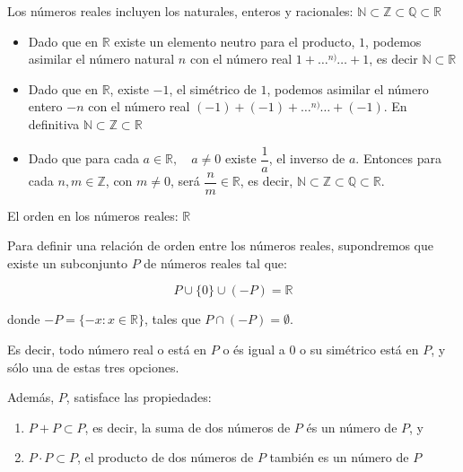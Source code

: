 \documentclass[
  ignorenonframetext,
]{beamer}
\begin{document}
\begin{frame}{Los números reales incluyen los naturales, enteros y
racionales:
\(\mathbb{N} \subset \mathbb{Z} \subset \mathbb{Q} \subset \mathbb{R}\)}
\protect\hypertarget{los-nuxfameros-reales-incluyen-los-naturales-enteros-y-racionales-mathbbn-subset-mathbbz-subset-mathbbq-subset-mathbbr}{}

\begin{itemize}
\item
  Dado que en \(\mathbb{R}\) existe un elemento neutro para el producto,
  \(1\), podemos asimilar el número natural \(n\) con el número real
  \(1+ \ldots \overset{n)}{} \ldots + 1\), es decir
  \(\mathbb{N} \subset \mathbb{R}\)
\item
  Dado que en \(\mathbb{R}\), existe \(-1\), el simétrico de \(1\),
  podemos asimilar el número entero \(-n\) con el número real
  \((-1)+(-1)+ \ldots \overset{n)}{} \ldots +(-1)\). En definitiva
  \(\mathbb{N} \subset \mathbb{Z} \subset \mathbb{R}\)
\item
  Dado que para cada \(a \in \mathbb{R}, \quad a\neq 0\) existe
  \(\dfrac{1}{a}\), el inverso de \(a\). Entonces para cada
  \(n,m \in \mathbb{Z}\), con \(m \neq 0\), será
  \(\dfrac{n}{m} \in \mathbb{R}\), es decir,
  \(\mathbb{N} \subset \mathbb{Z} \subset \mathbb{Q} \subset \mathbb{R}\).
\end{itemize}

\end{frame}

\begin{frame}{El orden en los números reales: \(\mathbb{R}\)}
\protect\hypertarget{el-orden-en-los-nuxfameros-reales-mathbbr}{}

Para definir una relación de orden entre los números reales, supondremos
que existe un subconjunto \(P\) de números reales tal que:

\[
P \cup  \{ 0 \} \cup (-P) = \mathbb{R} 
\]

donde \(-P = \{-x: x \in \mathbb{R} \}\), tales que
\(P\cap (-P) = \emptyset\).

Es decir, todo número real o está en \(P\) o és igual a \(0\) o su
simétrico está en \(P\), y sólo una de estas tres opciones.

Además, \(P\), satisface las propiedades:

\begin{enumerate}
[(1)]
\item
  \(P+P \subset P\), es decir, la suma de dos números de \(P\) és un
  número de \(P\), y
\item
  \(P \cdot P \subset P\), el producto de dos números de \(P\) también
  es un número de \(P\)
\end{enumerate}

\end{frame}
\end{document}
